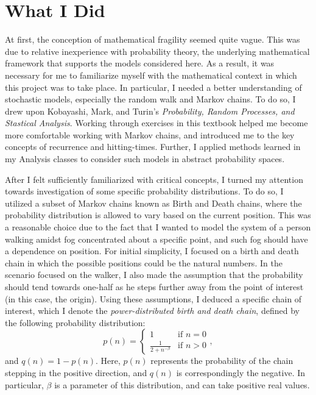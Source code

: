 \documentclass[12pt,letterpaper]{article}
\begin{document}
\section*{What I Did}
At first, the conception of mathematical fragility seemed quite vague. This was due to relative
inexperience with probability theory, the underlying mathematical framework that supports the models
considered here. As a result, it was necessary for me to familiarize myself with the mathematical
context in which this project was to take place. In particular, I needed a better understanding of
stochastic models, especially the random walk and Markov chains. To do so, I drew upon Kobayashi, Mark,
and Turin's \emph{Probability, Random Processes, and Stastical Analysis}. Working through exercises in
this textbook helped me become more comfortable working with Markov chains, and introduced me to the key
concepts of recurrence and hitting-times. Further, I applied methods learned in my Analysis classes to
consider such models in abstract probability spaces.

After I felt sufficiently familiarized with critical concepts, I turned my attention towards
investigation of some specific probability distributions. To do so, I utilized a subset of Markov chains
known as Birth and Death chains, where the probability distribution is allowed to vary based on the
current position. This was a reasonable choice due to the fact that I wanted to model the system of a
person walking amidst fog concentrated about a specific point, and such fog should have a dependence on
position. For initial simplicity, I focused on a birth and death chain in which the possible positions
could be the natural numbers. In the scenario focused on the walker, I also made the assumption that the
probability should tend towards one-half as he steps further away from the point of interest (in this
case, the origin). Using these assumptions, I deduced a specific chain of interest, which I denote the
\emph{power-distributed birth and death chain}, defined by the following probability distribution:
\[
    p(n) = \begin{cases}
        1 & \text{if } n = 0 \\
        \frac{1}{2+n^{-\beta}} & \text{if } n > 0
    \end{cases},
\]
and $q(n) = 1-p(n)$. Here, $p(n)$ represents the probability of the chain stepping in the positive
direction, and $q(n)$ is correspondingly the negative. In particular, $\beta$ is a parameter of this
distribution, and can take positive real values.
\end{document}
